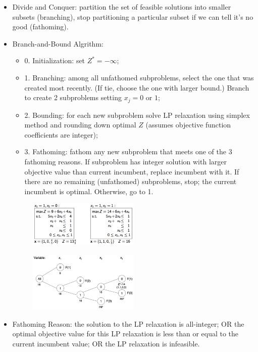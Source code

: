 \documentclass[10pt, twocolumn]{article}
\begin{document}
\begin{itemize}
\item Divide and Conquer: partition the set of feasible solutions into smaller subsets (branching), stop partitioning a particular subset if we can tell it’s no good (fathoming).
\item Branch-and-Bound Algrithm: 
\begin{itemize}
  \item 0. Initialization: set $Z^*=-\infty$; 
  \item 1. Branching: among all unfathomed subproblems, select the one that was created most recently. (If tie, choose the one with larger bound.) Branch to create 2 subproblems setting $x_j =0 \text{ or } 1$; 
  \item 2. Bounding: for each new subproblem solve LP relaxation using simplex method and rounding down optimal $Z$ (assumes objective function coefficients are integer); 
  \item 3. Fathoming: fathom any new subproblem that meets one of the 3 fathoming reasons. If subproblem has integer solution with larger objective value than current incumbent, replace incumbent with it. If there are no remaining (unfathomed) subproblems, stop; the current incumbent is optimal. Otherwise, go to 1.
\end{itemize}
\begin{figure}[!h]
\centering
\includegraphics[width=0.5\textwidth]{bab2}
\end{figure}
\begin{figure}[!h]
\centering
\includegraphics[width=0.5\textwidth]{bab1}
\end{figure}
\item Fathoming Reason: the solution to the LP relaxation is all-integer; OR the optimal objective value for this LP relaxation is less than or equal to the current incumbent value; OR the LP relaxation is infeasible.
\end{itemize}
\end{document}
